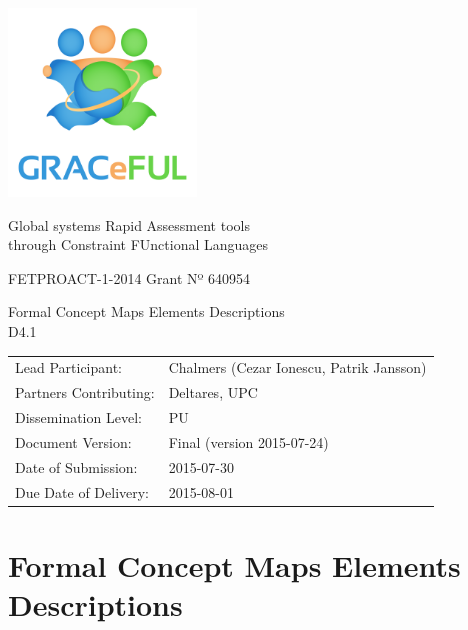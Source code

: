 \documentclass[]{article}
\author{}
\date{}
\begin{document}
\begin{center}
\includegraphics[width=5cm]{GRACeFULlogo.png}

\textcolor{GRACeFULblue}{Global systems Rapid Assessment tools\\
through Constraint FUnctional Languages}

\vspace{1cm}

FETPROACT-1-2014 Grant Nº 640954

\end{center}

\begin{framed}
\begin{center}
\Large
Formal Concept Maps Elements Descriptions\\[1ex]

D4.1\\[1ex]

\end{center}
\end{framed}

\vspace{1cm}

\noindent
\begin{tabular}{@{}ll@{}}
  Lead Participant:       & Chalmers (Cezar Ionescu, Patrik Jansson)
\\Partners Contributing:  & Deltares, UPC
\\Dissemination Level:    & PU
\\Document Version:       & Final (version 2015-07-24)
\\Date of Submission:     & 2015-07-30
\\Due Date of Delivery:   & 2015-08-01
\end{tabular}

\newpage

\section{Formal Concept Maps Elements
Descriptions}\label{formal-concept-maps-elements-descriptions}
\end{document}
